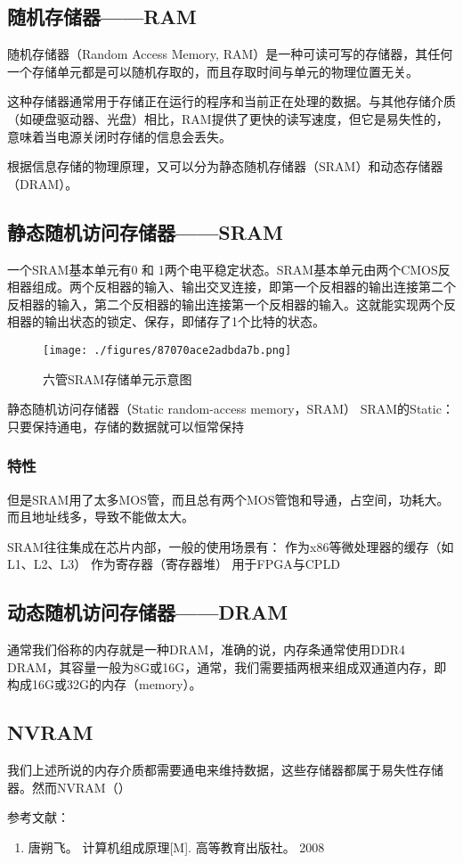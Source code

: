 
\begin{issues}
\issueDraft
\end{issues}

\subsection{随机存储器——RAM}

随机存储器（Random Access Memory, RAM）是一种可读可写的存储器，其任何一个存储单元都是可以随机存取的，而且存取时间与单元的物理位置无关。

这种存储器通常用于存储正在运行的程序和当前正在处理的数据。与其他存储介质（如硬盘驱动器、光盘）相比，RAM提供了更快的读写速度，但它是易失性的，意味着当电源关闭时存储的信息会丢失。

根据信息存储的物理原理，又可以分为静态随机存储器（SRAM）和动态存储器（DRAM）。




\subsection{静态随机访问存储器——SRAM}

一个SRAM基本单元有0 和 1两个电平稳定状态。SRAM基本单元由两个CMOS反相器组成。两个反相器的输入、输出交叉连接，即第一个反相器的输出连接第二个反相器的输入，第二个反相器的输出连接第一个反相器的输入。这就能实现两个反相器的输出状态的锁定、保存，即储存了1个比特的状态。

\begin{figure}[ht]
\centering
\texttt{[image: ./figures/87070ace2adbda7b.png]}
\caption{六管SRAM存储单元示意图} \label{fig_RAM_3}
\end{figure}


静态随机访问存储器（Static random-access memory，SRAM）
SRAM的Static：只要保持通电，存储的数据就可以恒常保持

\subsubsection{特性}

但是SRAM用了太多MOS管，而且总有两个MOS管饱和导通，占空间，功耗大。而且地址线多，导致不能做太大。

SRAM往往集成在芯片内部，一般的使用场景有：
作为x86等微处理器的缓存（如L1、L2、L3）
作为寄存器（寄存器堆）
用于FPGA与CPLD

\subsection{动态随机访问存储器——DRAM}

通常我们俗称的内存就是一种DRAM，准确的说，内存条通常使用DDR4 DRAM，其容量一般为8G或16G，通常，我们需要插两根来组成双通道内存，即构成16G或32G的内存（memory）。


\subsection{NVRAM}

我们上述所说的内存介质都需要通电来维持数据，这些存储器都属于易失性存储器。然而NVRAM（）



参考文献：
\begin{enumerate}
\item 唐朔飞。 计算机组成原理[M]. 高等教育出版社。 2008
\end{enumerate}
